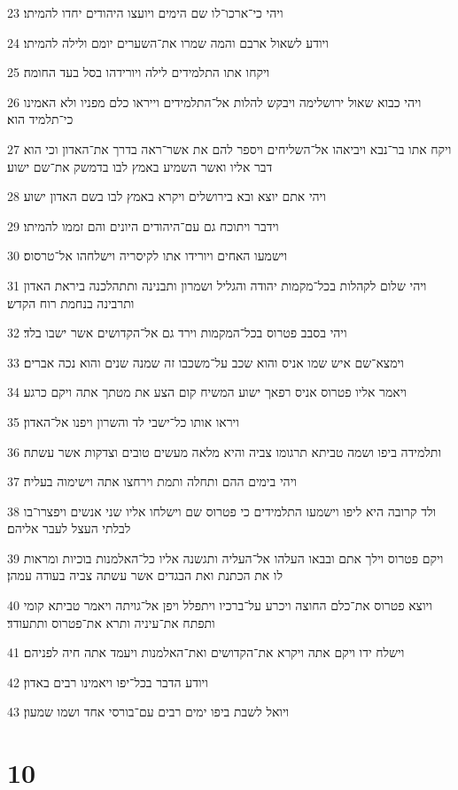 \par 23 ויהי כי־ארכו־לו שם הימים ויועצו היהודים יחדו להמיתו׃
\par 24 ויודע לשאול ארבם והמה שמרו את־השערים יומם ולילה להמיתו׃
\par 25 ויקחו אתו התלמידים לילה ויורידהו בסל בעד החומה׃
\par 26 ויהי כבוא שאול ירושלימה ויבקש להלות אל־התלמידים וייראו כלם מפניו ולא האמינו כי־תלמיד הוא׃
\par 27 ויקח אתו בר־נבא ויביאהו אל־השליחים ויספר להם את אשר־ראה בדרך את־האדון וכי הוא דבר אליו ואשר השמיע באמץ לבו בדמשק את־שם ישוע׃
\par 28 ויהי אתם יוצא ובא בירושלים ויקרא באמץ לבו בשם האדון ישוע׃
\par 29 וידבר ויתוכח גם עם־היהודים היונים והם זממו להמיתו׃
\par 30 וישמעו האחים ויורידו אתו לקיסריה וישלחהו אל־טרסוס׃
\par 31 ויהי שלום לקהלות בכל־מקמות יהודה והגליל ושמרון ותבנינה ותתהלכנה ביראת האדון ותרבינה בנחמת רוח הקדש׃
\par 32 ויהי בסבב פטרוס בכל־המקמות וירד גם אל־הקדושים אשר ישבו בלד׃
\par 33 וימצא־שם איש שמו אניס והוא שכב על־משכבו זה שמנה שנים והוא נכה אברים׃
\par 34 ויאמר אליו פטרוס אניס רפאך ישוע המשיח קום הצע את מטתך אתה ויקם כרגע׃
\par 35 ויראו אותו כל־ישבי לד והשרון ויפנו אל־האדון׃
\par 36 ותלמידה ביפו ושמה טביתא תרגומו צביה והיא מלאה מעשים טובים וצדקות אשר עשתה׃
\par 37 ויהי בימים ההם ותחלה ותמת וירחצו אתה וישימוה בעליה׃
\par 38 ולד קרובה היא ליפו וישמעו התלמידים כי פטרוס שם וישלחו אליו שני אנשים ויפצרו־בו לבלתי העצל לעבר אליהם׃
\par 39 ויקם פטרוס וילך אתם ובבאו העלהו אל־העליה ותגשנה אליו כל־האלמנות בוכיות ומראות לו את הכתנת ואת הבגדים אשר עשתה צביה בעודה עמהן׃
\par 40 ויוצא פטרוס את־כלם החוצה ויכרע על־ברכיו ויתפלל ויפן אל־גויתה ויאמר טביתא קומי ותפתח את־עיניה ותרא את־פטרוס ותתעודד׃
\par 41 וישלח ידו ויקם אתה ויקרא את־הקדושים ואת־האלמנות ויעמד אתה חיה לפניהם׃
\par 42 ויודע הדבר בכל־יפו ויאמינו רבים באדון׃
\par 43 ויואל לשבת ביפו ימים רבים עם־בורסי אחד ושמו שמעון׃

\chapter{10}

